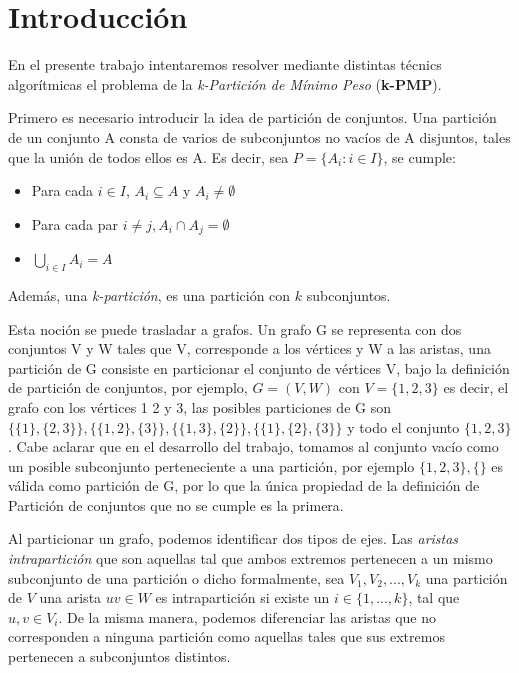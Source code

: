\section{Introducci\'on}

En el presente trabajo intentaremos resolver mediante distintas t\'ecnics algor\'itmicas el problema de la \textit{k-Partici\'on de M\'inimo Peso} (\textbf{k-PMP}).

Primero es necesario introducir la idea de partici\'on de conjuntos. Una partici\'on de un conjunto A consta de varios de subconjuntos no vac\'ios de A disjuntos, tales que la uni\'on de todos ellos es A.  Es decir, sea $P = \{A_{i}: i ∈ I \}$, se cumple:
\begin{itemize}
\item Para cada $i \in I$, $A_{i} \subseteq A$ y $A_{i} \neq \emptyset$
\item Para cada par $i \neq j, A_{i} \cap A_{j} = \emptyset$
\item $\bigcup_{i \in I} A_{i} = A$
\end{itemize}
Adem\'as, una \textit{k-partici\'on}, es una partici\'on con $k$ subconjuntos.

Esta noci\'on se puede trasladar a grafos. Un grafo G se representa con dos conjuntos V y W tales que V, corresponde a los v\'ertices y W a las aristas, una partici\'on de G consiste en particionar el conjunto de v\'ertices V, bajo la definici\'on de partici\'on de conjuntos, por ejemplo, $G=(V,W)$ con $V=\{1,2,3\}$ es decir, el grafo con los v\'ertices 1 2 y 3, las posibles particiones de G son $\{\{1\},\{2,3\}\}, \{\{1,2\},\{3\}\}, \{\{1,3\},\{2\}\}, \{\{1\},\{2\},\{3\}\}$ y todo el conjunto $\{1,2,3\}$. Cabe aclarar que en el desarrollo del trabajo, tomamos al conjunto vac\'io como un posible subconjunto perteneciente a una  partici\'on, por ejemplo $\{1,2,3\},\{\}$ es v\'alida como partici\'on de G, por lo que la \'unica propiedad de la definici\'on de Partici\'on de conjuntos que no se cumple es la primera.

Al particionar un grafo, podemos identificar dos tipos de ejes. Las \textit{aristas intrapartici\'on} que son aquellas tal que ambos extremos pertenecen a un mismo subconjunto de una partici\'on o dicho formalmente, sea $V_{1},V_{2},...,V_{k}$ una partici\'on de $V$ una arista $uv \in W$ es intrapartici\'on si existe un $i \in \{1,...,k\}$, tal que $u, v \in V_{i}$. De la misma manera, podemos diferenciar las aristas que no corresponden a ninguna partici\'on como aquellas tales que sus extremos pertenecen a subconjuntos distintos.

